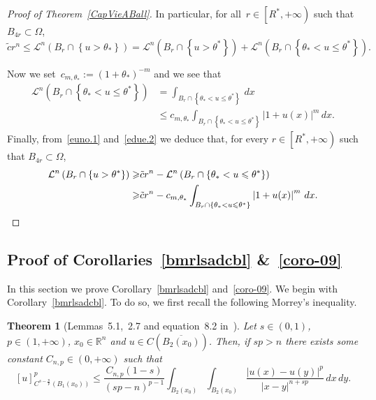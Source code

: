 \documentclass[12pt]{article}
\newcommand{\R}{\mathbb{R}}
\numberwithin{equation}{section}
\newtheorem{thm}{Theorem}[section]
\renewcommand{\leq}{\leqslant}
\renewcommand{\geq}{\geqslant}
\begin{document}
\begin{proof}[Proof of Theorem~\ref{CapVieABall}]
In particular, for all~$r\in \left[R^*,+\infty\right)$ such that $B_{4r} \subset\Omega$,
\begin{equation}\label{euno.1}
\tilde{c} r^n\leq \mathcal{L}^n(B_r\cap \left\lbrace u>\theta_*\right\rbrace)=\mathcal{L}^n(B_r\cap \left\lbrace u>\theta^*\right\rbrace)+\mathcal{L}^n(B_r\cap \left\lbrace \theta_*<u\leq \theta^*\right\rbrace).
\end{equation}

Now we set~$c_{m,\theta_*}:=(1+\theta_*)^{-m}$ and we see that
\begin{equation}\label{edue.2}
\begin{split}
\mathcal{L}^n\left(B_r\cap \left\lbrace \theta_{*}<u\leq \theta^* \right\rbrace\right)&=\int_{B_r\cap \left\lbrace \theta_{*}<u\leq \theta^* \right\rbrace}\,dx\\
& \leq c_{m,\theta_*}\int_{B_r\cap \left\lbrace \theta_{*}<u\leq \theta^* \right\rbrace}\left|1+u(x)\right|^m\,dx.
\end{split}
\end{equation}
Finally, from~\eqref{euno.1} and~\eqref{edue.2} we deduce that, for every $r\in\left[R^*,+\infty\right)$  such that $B_{4r}\subset \Omega$,
\begin{equation*}
\begin{split}
\mathcal{L}^n\left(B_r\cap \left\lbrace u>\theta^* \right\rbrace\right) \geq & \tilde{c}r^n-\mathcal{L}^n\left(B_r\cap \left\lbrace \theta_*<u\leq \theta^*\right\rbrace\right)\\
\geq & \tilde{c} r^n- c_{m,\theta_*}\int_{B_r\cap \left\lbrace \theta_{*}<u\leq \theta^* \right\rbrace}\left|1+u(x)\right|^m\,dx.\qedhere
\end{split}
\end{equation*}   
\end{proof}

\subsection{Proof of Corollaries~\ref{bmrlsadcbl} \&~\ref{coro-09}}\label{hyg-yh-654}

In this section we prove Corollary~\ref{bmrlsadcbl} and~\ref{coro-09}. We begin with Corollary~\ref{bmrlsadcbl}. To do so, we first recall the following Morrey's inequality. 
\begin{thm}[Lemmas~5.1,~2.7 and equation~8.2 in~\cite{brasco2024morrey}]\label{basdcfzrty65}
Let $s\in (0,1)$, $p\in (1,+\infty)$, $x_0\in\R^n$ and $u\in C\left(\overline{B_2(x_0)}\right)$. Then, if $sp>n$ there exists some constant $C_{n,p}\in (0,+\infty)$ such that
\begin{equation*}
\left[u\right]_{C^{s-\frac{n}{p}}(B_1(x_0))}^p\leq \frac{C_{n,p}(1-s)}{(sp-n)^{p-1}}\int_{B_2(x_0)}\int_{B_2(x_0)}\frac{\left|u(x)-u(y)\right|^p}{\left|x-y\right|^{n+sp}}\,dx\,dy.
\end{equation*}
\end{thm}
\end{document}
